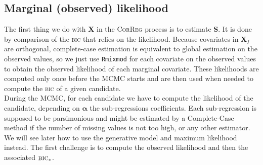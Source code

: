 \documentclass[12pt,a4paper]{report}
\begin{document}
\subsection{Marginal (observed) likelihood}
The first thing we do with $\boldsymbol{X}$ in the \textsc{CorReg} process is to estimate $\boldsymbol{S}$. It is done by comparison of the \textsc{bic} that relies on the likelihood. Because covariates in $\boldsymbol{X}_f$ are orthogonal, complete-case estimation is equivalent to global estimation on the observed values, so we just use {\tt Rmixmod} for each covariate on the observed values to obtain the observed likelihood of each marginal covariate. These likelihoods are computed only once before the MCMC starts and are then used when needed to compute the \textsc{bic} of a given candidate.\\

	 During the MCMC, for each candidate we have to compute the likelihood of the candidate, depending on $\boldsymbol{\alpha}$ the sub-regressions coefficients. Each sub-regression is supposed to be parsimonious and might be estimated by a Complete-Case method if the number of missing values is not too high, or any other estimator. We will see later how to use the generative model and maximum likelihood instead. The first challenge is to compute the observed likelihood and then the associated $\textsc{bic}_*$.  \\
	 
\end{document}
